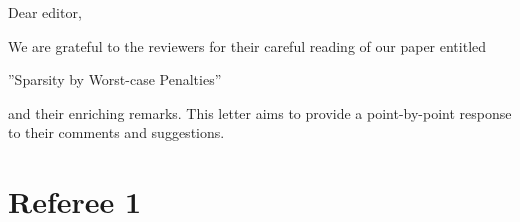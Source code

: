 \documentclass[a4paper,11pt]{texMemo}
\begin{document}
\maketitle
Dear editor,

We are grateful to the reviewers for their careful reading  of
our paper entitled

\begin{center}
  ''Sparsity by Worst-case Penalties''
\end{center}

and their enriching remarks. This letter aims to provide a
point-by-point response to their comments and suggestions.

\section*{Referee 1}

\end{document}

